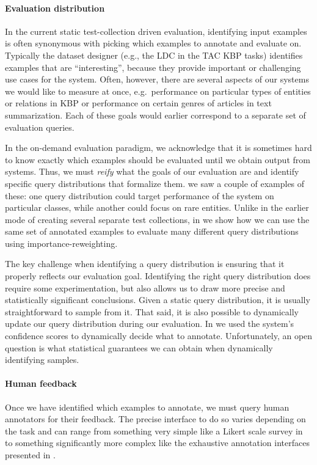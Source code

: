 \paragraph{Evaluation distribution}
In the current static test-collection driven evaluation, identifying input examples is often synonymous with picking which examples to annotate and evaluate on.
Typically the dataset designer (e.g., the LDC in the TAC KBP tasks) identifies examples that are ``interesting'', because they provide important or challenging use cases for the system.
Often, however, there are several aspects of our systems we would like to measure at once, e.g.\ performance on particular types of entities or relations in KBP or performance on certain genres of articles in text summarization.
Each of these goals would earlier correspond to a separate set of evaluation queries. 

In the on-demand evaluation paradigm, 
  we acknowledge that it is sometimes hard to know exactly which examples should be evaluated until we obtain output from systems.
Thus, we must \textit{reify} what the goals of our evaluation are and identify specific query distributions that formalize them.
 we saw a couple of examples of these: one query distribution could target performance of the system on particular classes, while another could focus on rare entities.
Unlike in the earlier mode of creating several separate test collections, in  we show how we can use the same set of annotated examples to evaluate many different query distributions using importance-reweighting.

The key challenge when identifying a query distribution is ensuring that it properly reflects our evaluation goal.
Identifying the right query distribution does require some experimentation, but also allows us to draw more precise and statistically significant conclusions.
Given a static query distribution, it is usually straightforward to sample from it.
That said, it is also possible to dynamically update our query distribution during our evaluation.
In  we used the system's confidence scores to dynamically decide what to annotate.
Unfortunately, an open question is what statistical guarantees we can obtain when dynamically identifying samples.

\paragraph{Human feedback}
Once we have identified which examples to annotate, we must query human annotators for their feedback.
The precise interface to do so varies depending on the task and can range from something very simple like a Likert scale survey in  to something significantly more complex like the exhaustive annotation interfaces presented in .

